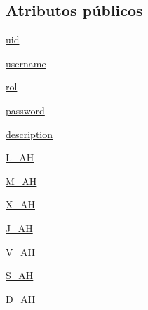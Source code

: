 \subsection*{Atributos públicos}
\begin{DoxyCompactItemize}
\item 
\hyperlink{classdb__layer_1_1_user_a6dd94ba7a77cae42cef41f5f96c01350}{uid}
\item 
\hyperlink{classdb__layer_1_1_user_a9c0caa7abefdca0584f2a1420afcab3c}{username}
\item 
\hyperlink{classdb__layer_1_1_user_a9653e795718277a60fad44950b9c7f35}{rol}
\item 
\hyperlink{classdb__layer_1_1_user_a0789b78aa38f55339c6d584363207566}{password}
\item 
\hyperlink{classdb__layer_1_1_user_aa2c9cfe4abc9eaa4a24a03f8cb2fb0f0}{description}
\item 
\hyperlink{classdb__layer_1_1_user_afd2659105a8f031b05e128a7e6280e3d}{L\-\_\-\-A\-H}
\item 
\hyperlink{classdb__layer_1_1_user_a8bf13647d6c4516d117c8d2ee34c0eb1}{M\-\_\-\-A\-H}
\item 
\hyperlink{classdb__layer_1_1_user_a3150f6b59d838d843a61afe7793c0c1b}{X\-\_\-\-A\-H}
\item 
\hyperlink{classdb__layer_1_1_user_a41f3568a4ad9b61374e53e3a44a23894}{J\-\_\-\-A\-H}
\item 
\hyperlink{classdb__layer_1_1_user_ae3a5a2f62fd59fb8e1527e18c5dd4681}{V\-\_\-\-A\-H}
\item 
\hyperlink{classdb__layer_1_1_user_a0360cfcd177fc4336b8ea141e5ca956a}{S\-\_\-\-A\-H}
\item 
\hyperlink{classdb__layer_1_1_user_a3c3567edc18b74fd8b72325dd92a7319}{D\-\_\-\-A\-H}
\end{DoxyCompactItemize}
